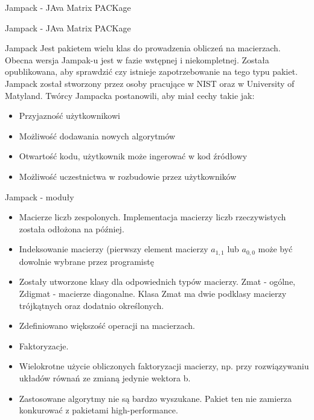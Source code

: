 	\begin{subsection}{Jampack - JAva Matrix PACKage}
	\begin{frame}{Jampack - JAva Matrix PACKage}
		\begin{block}{Jampack}
			Jest pakietem wielu klas do prowadzenia obliczeń na macierzach. Obecna wersja Jampak-u jest w fazie wstępnej i niekompletnej. Została opublikowana, aby sprawdzić czy istnieje zapotrzebowanie na tego typu pakiet. Jampack został stworzony przez osoby pracujące w NIST oraz w University of Matyland. Twórcy Jampacka postanowili, aby miał cechy takie jak:
			\begin{itemize}
				\item Przyjazność użytkownikowi
				\item Możliwość dodawania nowych algorytmów
				\item Otwartość kodu, użytkownik może ingerować w kod źródłowy
				\item Możliwość uczestnictwa w rozbudowie przez użytkowników\
			\end{itemize}
		\end{block}
	\end{frame}
	\begin{frame}{Jampack - moduły}
		\begin{itemize}
			\item Macierze liczb zespolonych. Implementacja macierzy liczb rzeczywistych została odłożona na później.
			\item Indeksowanie macierzy (pierwszy element macierzy $a_{1,1}$ lub $a_{0,0}$ może być dowolnie wybrane przez programistę
			\item Zostały utworzone klasy dla odpowiednich typów macierzy. Zmat - ogólne, Zdigmat - macierze diagonalne. Klasa Zmat ma dwie podklasy macierzy trójkątnych oraz dodatnio określonych. 
			\item Zdefiniowano większość operacji na macierzach. 
			\item Faktoryzacje.
			\item Wielokrotne użycie obliczonych faktoryzacji macierzy, np. przy rozwiązywaniu układów równań ze zmianą jedynie wektora b.
			\item Zastosowane algorytmy nie są bardzo wyszukane. Pakiet ten nie zamierza konkurować z pakietami high-performance.
		\end{itemize}
	\end{frame}
	\end{subsection}
